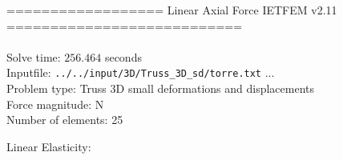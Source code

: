 \documentclass[a4paper,11pt]{article}
\begin{document}

================== Linear Axial Force IETFEM v2.11 ===========================\\\\


Solve time: $256.464$ seconds \\

Inputfile: \verb|../../input/3D/Truss_3D_sd/torre.txt|  ... \\

Problem type: Truss 3D small deformations and displacements\\ 

Force magnitude: N \\

Number of elements: 25 \\

\newpage       

Linear Elasticity:\\
\end{document}
